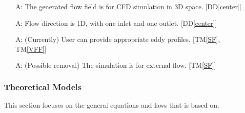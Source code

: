 \documentclass[12pt]{article}
\newcommand{\ddref}[1]{DD\ref{#1}}
\newcommand{\tref}[1]{TM\ref{#1}}
\newcounter{assumpnum} %
\begin{document}
\begin{itemize}

\item[A\refstepcounter{assumpnum}\theassumpnum \label{A_3D}:] The generated flow field is for CFD simulation in 3D space. [\ddref{center}]
\item[A\refstepcounter{assumpnum}\theassumpnum \label{A_1D}:] Flow direction is 1D, with one inlet and one outlet. [\ddref{center}]
\item[A\refstepcounter{assumpnum}\theassumpnum \label{A_eddy}:] (Currently) User can provide appropriate eddy profiles. [\tref{SF}, \tref{VFF}]
\item[A\refstepcounter{assumpnum}\theassumpnum \label{A_ext}:] (Possible removal) The simulation is for external flow. [\tref{SF}]

\end{itemize}

\subsubsection{Theoretical Models}\label{sec_theoretical}



This section focuses on the general equations and laws that \progname{} is based
on.  

~\newline
\end{document}
